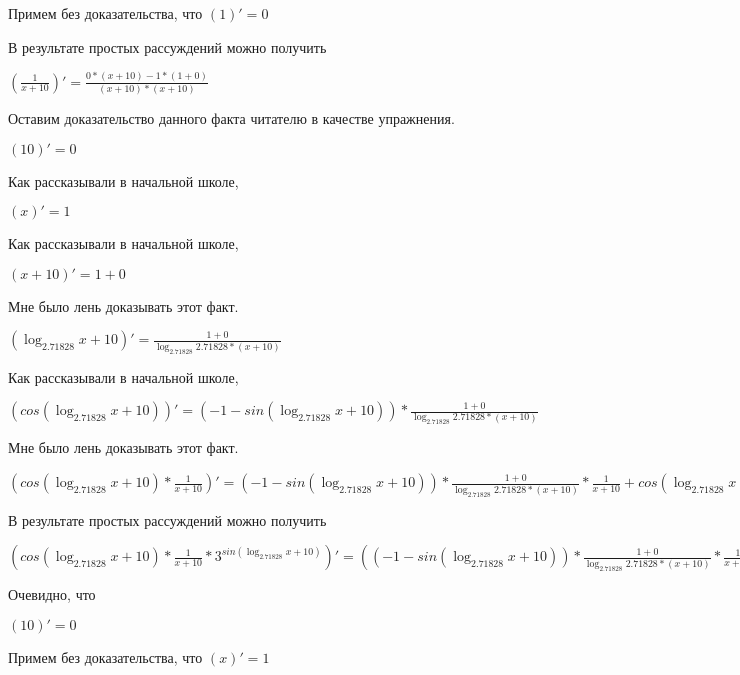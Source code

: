 \documentclass[12pt,a4paper,fleqn]{article}
\theoremstyle{definition}
\begin{document}
Примем без доказательства, что
$( 1 )' =  0 $

В результате простых рассуждений можно получить

$(\frac{ 1 }{ x  +  10 }
)' = \frac{ 0  * ( x  +  10 ) -  1  * ( 1  +  0 )}{( x  +  10 ) * ( x  +  10 )}
$

Оставим доказательство данного факта читателю в качестве упражнения.

$( 10 )' =  0 $

Как рассказывали в начальной школе,

$( x )' =  1 $

Как рассказывали в начальной школе,

$( x  +  10 )' =  1  +  0 $

Мне было лень доказывать этот факт.

$(\log_{ 2.71828 }{ x  +  10 })' = \frac{ 1  +  0 }{\log_{ 2.71828 }{ 2.71828 } * ( x  +  10 )}
$

Как рассказывали в начальной школе,

$(cos(\log_{ 2.71828 }{ x  +  10 }))' = ( -1  - sin(\log_{ 2.71828 }{ x  +  10 })) * \frac{ 1  +  0 }{\log_{ 2.71828 }{ 2.71828 } * ( x  +  10 )}
$

Мне было лень доказывать этот факт.

$(cos(\log_{ 2.71828 }{ x  +  10 }) * \frac{ 1 }{ x  +  10 }
)' = ( -1  - sin(\log_{ 2.71828 }{ x  +  10 })) * \frac{ 1  +  0 }{\log_{ 2.71828 }{ 2.71828 } * ( x  +  10 )}
 * \frac{ 1 }{ x  +  10 }
 + cos(\log_{ 2.71828 }{ x  +  10 }) * \frac{ 0  * ( x  +  10 ) -  1  * ( 1  +  0 )}{( x  +  10 ) * ( x  +  10 )}
$

В результате простых рассуждений можно получить

$(cos(\log_{ 2.71828 }{ x  +  10 }) * \frac{ 1 }{ x  +  10 }
 * { 3 }^{sin(\log_{ 2.71828 }{ x  +  10 })})' = (( -1  - sin(\log_{ 2.71828 }{ x  +  10 })) * \frac{ 1  +  0 }{\log_{ 2.71828 }{ 2.71828 } * ( x  +  10 )}
 * \frac{ 1 }{ x  +  10 }
 + cos(\log_{ 2.71828 }{ x  +  10 }) * \frac{ 0  * ( x  +  10 ) -  1  * ( 1  +  0 )}{( x  +  10 ) * ( x  +  10 )}
) * { 3 }^{sin(\log_{ 2.71828 }{ x  +  10 })} + cos(\log_{ 2.71828 }{ x  +  10 }) * \frac{ 1 }{ x  +  10 }
 * \log_{ 2.71828 }{ 3 } * cos(\log_{ 2.71828 }{ x  +  10 }) * \frac{ 1  +  0 }{\log_{ 2.71828 }{ 2.71828 } * ( x  +  10 )}
 * { 3 }^{sin(\log_{ 2.71828 }{ x  +  10 })}$

Очевидно, что

$( 10 )' =  0 $

Примем без доказательства, что
$( x )' =  1 $
\end{document}
